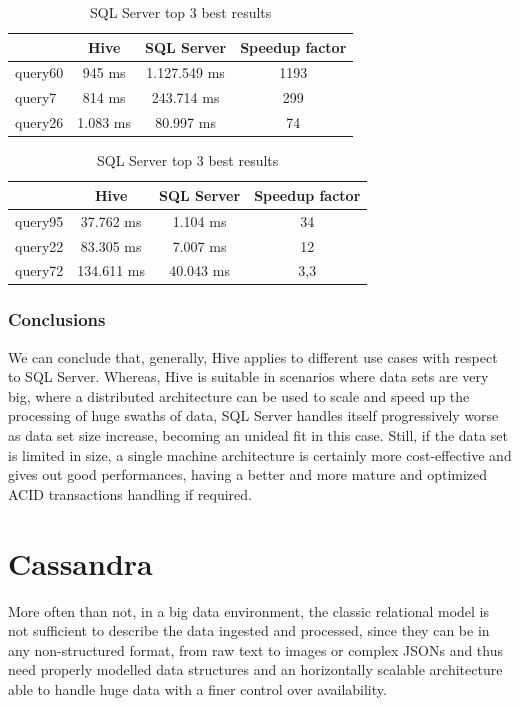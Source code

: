 \begin{table}[!htb]
    \begin{center}
            \caption{Hive top 3 best results}
        \begin{tabular}{|l|c|c|c|} \hline
            & Hive & SQL Server & Speedup factor\\ \hline
            query60 & 945 ms & 1.127.549 ms & 1193 \\ \hline
            query7 & 814 ms & 243.714 ms & 299 \\ \hline
            query26 & 1.083 ms & 80.997 ms & 74 \\ \hline
        \end{tabular}
    \bigskip
    \caption{SQL Server top 3 best results}
        \begin{tabular}{|l|c|c|c|} \hline
        & Hive & SQL Server & Speedup factor\\ \hline
        query95 & 37.762 ms & 1.104 ms & 34 \\ \hline
        query22 & 83.305 ms & 7.007 ms & 12 \\ \hline
        query72 & 134.611 ms & 40.043 ms & 3,3 \\ \hline
    \end{tabular}
    \end{center}
\end{table}

\subsubsection{Conclusions}

We can conclude that, generally, Hive applies to different use cases with respect to SQL Server. Whereas, Hive is suitable in scenarios where data sets are very big, where a distributed architecture can be used to scale and speed up the processing of huge swaths of data, SQL Server handles itself progressively worse as data set size increase, becoming an unideal fit in this case. Still, if the data set is limited in size, a single machine architecture is certainly more cost-effective and gives out good performances, having a better and more mature and optimized ACID transactions handling if required.

\section{Cassandra}

More often than not, in a big data environment, the classic relational model is not sufficient to describe the data ingested and processed, since they can be in any non-structured format, from raw text to images or complex JSONs and thus need properly modelled data structures and an horizontally scalable architecture able to handle huge data with a finer control over availability.

